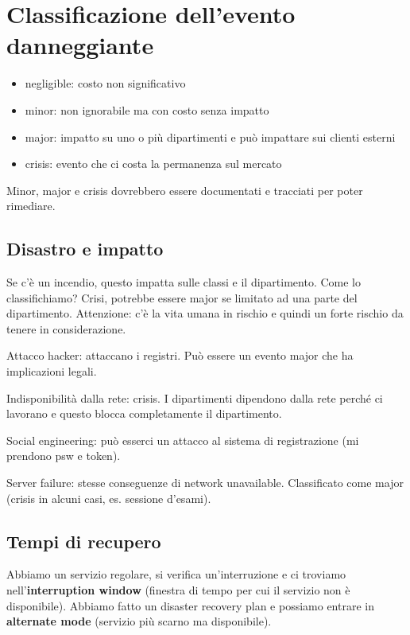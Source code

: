 \section{Classificazione dell'evento danneggiante}

\begin{itemize}
\item negligible: costo non significativo
\item minor: non ignorabile ma con costo senza impatto
\item major: impatto su uno o più dipartimenti e può impattare sui clienti esterni
\item crisis: evento che ci costa la permanenza sul mercato
\end{itemize}

Minor, major e crisis dovrebbero essere documentati e tracciati per poter rimediare.

\subsection{Disastro e impatto}


Se c'è un incendio, questo impatta sulle classi e il dipartimento. Come lo classifichiamo? Crisi, potrebbe essere major se limitato ad una parte del dipartimento. Attenzione: c'è la vita umana in rischio e quindi un forte rischio da tenere in considerazione.

Attacco hacker: attaccano i registri. Può essere un evento major che ha implicazioni legali.

Indisponibilità dalla rete: crisis. I dipartimenti dipendono dalla rete perché ci lavorano e questo blocca completamente il dipartimento.

Social engineering: può esserci un attacco al sistema di registrazione (mi prendono psw e token).

Server failure: stesse conseguenze di network unavailable. Classificato come major (crisis in alcuni casi, es. sessione d'esami).

\subsection{Tempi di recupero}

Abbiamo un servizio regolare, si verifica un'interruzione e ci troviamo nell'\textbf{interruption window} (finestra di tempo per cui il servizio non è disponibile). Abbiamo fatto un disaster recovery plan e possiamo entrare in \textbf{alternate mode} (servizio più scarno ma disponibile).


